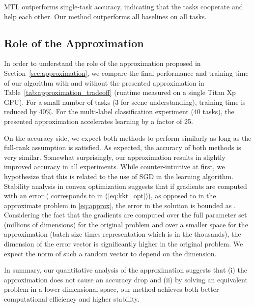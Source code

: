 \documentclass{article}
\begin{document}
MTL outperforms single-task accuracy, indicating that the tasks cooperate and help each other. Our method outperforms all baselines on all tasks.


\subsection{Role of the Approximation}

In order to understand the role of the approximation proposed in Section~\ref{sec:approximation}, we compare the final performance and training time of our algorithm with and without the presented approximation in Table~\ref{tab:approximation_tradeoff} (runtime measured on a single Titan Xp GPU). For a small number of tasks (3 for scene understanding), training time is reduced by 40\%. For the multi-label classification experiment (40 tasks), the presented approximation accelerates learning by a factor of 25.

On the accuracy side, we expect both methods to perform similarly as long as the full-rank assumption is satisfied. As expected, the accuracy of both methods is very similar. Somewhat surprisingly, our approximation results in slightly improved accuracy in all experiments. While counter-intuitive at first, we hypothesize that this is related to the use of SGD in the learning algorithm. Stability analysis in convex optimization suggests that if gradients are computed with an error  ( corresponds to  in (\ref{eq:kkt_opt})), as opposed to  in the approximate problem in \ref{eq:approx}, the error in the solution is bounded as . Considering the fact that the gradients are computed over the full parameter set (millions of dimensions) for the original problem and over a smaller space for the approximation (batch size times representation which is in the thousands), the dimension of the error vector is significantly higher in the original problem. We expect the  norm of such a random vector to depend on the dimension.

In summary, our quantitative analysis of the approximation suggests that (i) the approximation does not cause an accuracy drop and (ii) by solving an equivalent problem in a lower-dimensional space, our method achieves both better computational efficiency and higher stability.
\end{document}
